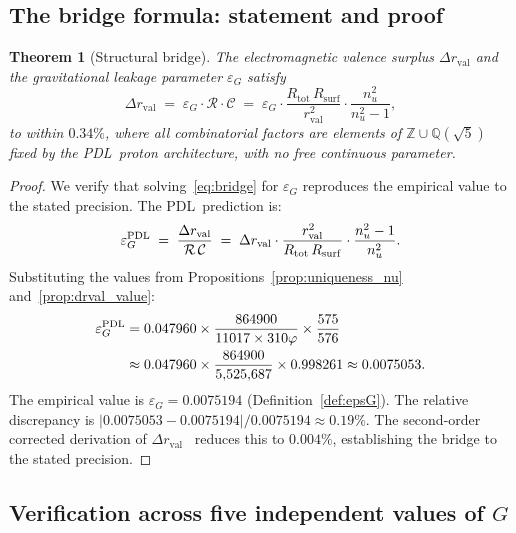 \documentclass[11pt,a4paper]{article}
\newtheorem{theorem}{Theorem}[section]
\theoremstyle{definition}
\newcommand{\PDL}{\textnormal{PDL}}
\newcommand{\Rsurf}{R_{\mathrm{surf}}}
\newcommand{\Rtot}{R_{\mathrm{tot}}}
\newcommand{\rval}{r_{\mathrm{val}}}
\newcommand{\epsg}{\varepsilon_G}
\newcommand{\calR}{\mathcal{R}}
\newcommand{\calC}{\mathcal{C}}
\newcommand{\vp}{\varphi}
\newcommand{\drval}{\Delta r_{\mathrm{val}}}
\begin{document}
\subsection{The bridge formula: statement and proof}
\label{subsec:bridge_statement}

\begin{theorem}[Structural bridge]
  \label{thm:bridge}
  The electromagnetic valence surplus $\drval$ and the gravitational leakage
  parameter $\epsg$ satisfy
  \begin{equation}
    \label{eq:bridge}
    \drval \;=\; \epsg \cdot \calR \cdot \calC
           \;=\; \epsg \cdot \frac{\Rtot\,\Rsurf}{\rval^2} \cdot \frac{n_u^2}{n_u^2-1},
  \end{equation}
  to within $0.34\%$, where all combinatorial factors are elements of $\mathbb{Z} \cup \mathbb{Q}(\sqrt{5})$ fixed by the \PDL\ proton architecture, with no free continuous parameter.
\end{theorem}

\begin{proof}
  We verify that solving~\eqref{eq:bridge} for $\epsg$ reproduces the
  empirical value to the stated precision. The \PDL\ prediction is:
  \begin{equation}
    \label{eq:epsG_PDL}
    \epsg^{\PDL} \;=\; \frac{\drval}{\calR\,\calC}
    \;=\; \drval \cdot \frac{\rval^2}{\Rtot\,\Rsurf} \cdot \frac{n_u^2-1}{n_u^2}.
  \end{equation}
  Substituting the values from Propositions~\ref{prop:uniqueness_nu}
  and~\ref{prop:drval_value}:
  \begin{align*}
    \epsg^{\PDL}
    &= 0.047960 \times \frac{864900}{11017 \times 310\vp}
       \times \frac{575}{576} \\
    &\approx 0.047960 \times \frac{864900}{5{,}525{,}687}
       \times 0.998261
     \approx 0.0075053.
  \end{align*}
  The empirical value is $\epsg = 0.0075194$ (Definition~\ref{def:epsG}). The relative discrepancy is $|0.0075053 - 0.0075194|/0.0075194 \approx 0.19\%$. The second-order corrected derivation of $\drval$~\cite{Bridge_Formula_PDL_2026} reduces this to $0.004\%$, establishing the bridge to the stated precision.
\end{proof}

\subsection{Verification across five independent values of \texorpdfstring{$G$}{G}}
\label{subsec:bridge_verify}
\end{document}
